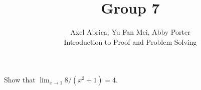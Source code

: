 \documentclass[12pt]{article}
\newenvironment{problem}[2][Problem]{\begin{trivlist}
\item[\hskip \labelsep {\bfseries #1}\hskip \labelsep {\bfseries #2.}]}{\end{trivlist}}
\begin{document}

\title{Group 7}%
\author{Axel Abrica, Yu Fan Mei, Abby Porter\\
	Introduction to Proof and Problem Solving} %

\maketitle

\begin{problem}{1}
    Show that $\lim_{x \to 1} 8/(x^2 + 1) = 4$.
\end{problem}
\end{document}
